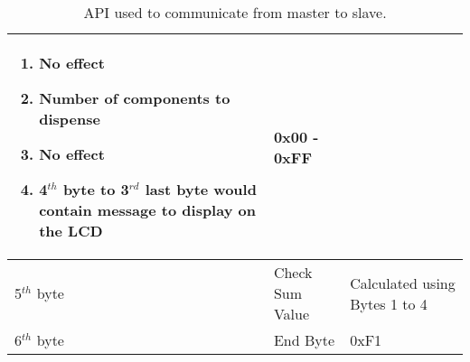 \documentclass[a4paper,11pt]{article}
\numberwithin{figure}{section}
\numberwithin{table}{section}
\begin{document}
\begin{table}[ht]
\begin{tabular}{| m{3cm} | m{5cm}| m{5cm} |}
\begin{enumerate}[nosep]
																				\setlength{\itemsep}{0pt}
   																				\setlength{\parskip}{0pt}
    																			\setlength{\parsep}{0pt} 
																				\item No effect
																				\item Number of components to dispense
																				\item No effect
																				\item 4$^{th}$ byte to 3$^{rd}$ last byte would contain message to display on the LCD
																			\end{enumerate} & 0x00 - 0xFF \\
			\hline
			5$^{th}$ byte & Check Sum Value & Calculated using Bytes 1 to 4 \\
			\hline
			6$^{th}$ byte & End Byte & 0xF1 \\
			\hline
			\end{tabular}
			\caption{API used to communicate from master to slave. \label{tab:M2SAPI}}
		\end{table}
	\newpage
\end{document}
